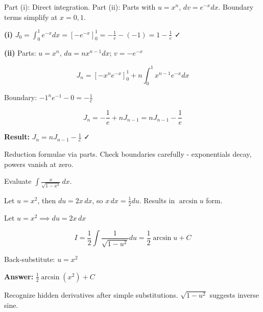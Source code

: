 \begin{hint}
Part (i): Direct integration. Part (ii): Parts with $u=x^n$, $dv=e^{-x}dx$. Boundary terms simplify at $x=0,1$.
\end{hint}

\begin{solution}
\textbf{(i)} $J_0 = \int_0^1 e^{-x} dx = [-e^{-x}]_0^1 = -\frac{1}{e} - (-1) = 1 - \frac{1}{e}$ ✓

\textbf{(ii)} Parts: $u=x^n$, $du=nx^{n-1}dx$; $v=-e^{-x}$

\[
J_n = [-x^n e^{-x}]_0^1 + n\int_0^1 x^{n-1}e^{-x} dx
\]

Boundary: $-1^n e^{-1} - 0 = -\frac{1}{e}$

\[
J_n = -\frac{1}{e} + nJ_{n-1} = nJ_{n-1} - \frac{1}{e}
\]

\textbf{Result:} $\boxed{J_n = nJ_{n-1} - \frac{1}{e}}$ ✓
\end{solution}

\begin{takeaways}
Reduction formulae via parts. Check boundaries carefully - exponentials decay, powers vanish at zero.
\end{takeaways}

\vspace{1cm}

\begin{problem}
Evaluate $\int \frac{x}{\sqrt{1-x^4}} \, dx$.
\end{problem}

\begin{hint}
Let $u = x^2$, then $du = 2x \, dx$, so $x \, dx = \frac{1}{2}du$. Results in $\arcsin u$ form.
\end{hint}

\begin{solution}
Let $u = x^2 \implies du = 2x \, dx$

\[
I = \frac{1}{2}\int \frac{1}{\sqrt{1-u^2}} du = \frac{1}{2}\arcsin u + C
\]

Back-substitute: $u = x^2$

\textbf{Answer:} $\boxed{\frac{1}{2}\arcsin(x^2) + C}$
\end{solution}

\begin{takeaways}
Recognize hidden derivatives after simple substitutions. $\sqrt{1-u^2}$ suggests inverse sine.
\end{takeaways}

\vspace{1cm}

